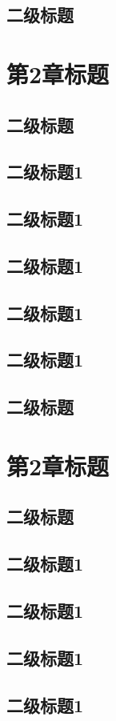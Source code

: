\documentclass[master,academic]{ysuthesis} %
\begin{document}
	\section{二级标题}
	\chapter{第2章标题}
	\section{二级标题}
	\section{二级标题1}
	\section{二级标题1}
	\section{二级标题1}
	\section{二级标题1}
	\section{二级标题1}
	\section{二级标题}
	\chapter{第2章标题}
	\section{二级标题}
	\section{二级标题1}
	\section{二级标题1}
	\section{二级标题1}
	\section{二级标题1}
\end{document}

